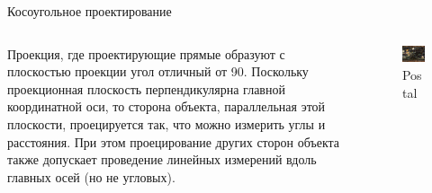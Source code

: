 \documentclass{beamer}
\begin{document}
	\begin{frame}{Косоугольное проектирование}
	\begin{columns}
		\begin{column}{0.45\textwidth}
			Проекция, где проектирующие прямые образуют с плоскостью проекции угол отличный от 90\textdegree.
			{ \scriptsize
			Поскольку проекционная плоскость перпендикулярна главной координатной оси, 
		то сторона объекта, параллельная этой плоскости, проецируется так, что можно измерить углы и расстояния. 
		При этом проецирование других сторон объекта также допускает проведение линейных измерений вдоль главных осей (но не угловых).
			}
		\end{column}
		\begin{column}{0.55\textwidth}
			\begin{figure} 
					\includegraphics[width=\textwidth]{images/postal.jpg}
				\caption{Postal}
			\end{figure}
		\end{column}
	\end{columns}
	\end{frame}
\end{document}
